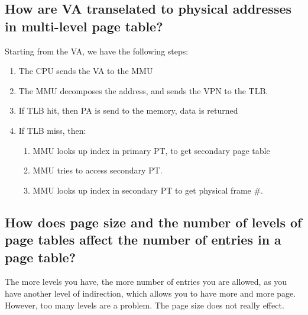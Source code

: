 \documentclass[a4paper]{article}
\begin{document}
\subsection{How are VA transelated to physical addresses in multi-level page table?} %
\label{sub:How are VA transelated to physical addresses in multi-level page table?}
Starting from the VA, we have the following steps:
\begin{enumerate}
  \item The CPU sends the VA to the MMU
  \item The MMU decomposes the address, and sends the VPN to the TLB.
  \item If TLB hit, then PA is send to the memory, data is returned
  \item If TLB miss, then:
    \begin{enumerate}
      \item MMU looks up index in primary PT, to get secondary page table
      \item MMU tries to access secondary PT.
      \item MMU looks up index in secondary PT to get physical frame $\#$.
    \end{enumerate}
\end{enumerate}
\subsection{How does page size and the number of levels of page tables affect the number of entries in a page table?} %
\label{sub:How does page size and the number of leverls of page tables affect the number of entries in a page table?}
The more levels you have, the more number of entries you are allowed, as you have another level of indirection, which allows
you to have more and more page. However, too many levels are a problem. The page size does not really effect.
\end{document}
